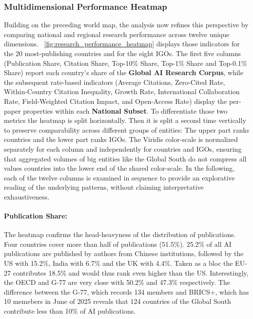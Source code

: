 \documentclass{article}
\begin{document}
	
	
	
	\subsubsection{Multidimensional Performance Heatmap}
	\label{performance_heatmap}
	Building on the preceding world map, the analysis now refines this perspective by comparing national and regional research performance across twelve unique dimensions. \figurename~\ref{fig:research_performance_heatmap} displays those indicators for the 20 most-publishing countries and for the eight IGOs. The first five columns (Publication Share, Citation Share, Top-10\% Share, Top-1\% Share and Top-0.1\% Share) report each country’s share of the \textbf{Global AI Research Corpus}, while the subsequent rate-based indicators (Average Citations, Zero-Cited Rate, Within-Country Citation Inequality, Growth Rate, International Collaboration Rate, Field-Weighted Citation Impact, and Open-Access Rate) display the per-paper properties within each \textbf{National Subset}. To differentiate those two metrics the heatmap is split horizontally. Then it is split a second time vertically to preserve comparability across different groups of entities: The upper part ranks countries and the lower part ranks IGOs. The Viridis color-scale is normalized separately for each column and independently for countries and IGOs, ensuring that aggregated volumes of big entities like the Global South do not compress all values countries into the lower end of the shared color-scale. In the following, each of the twelve columns is examined in sequence to provide an explorative reading of the underlying patterns, without claiming interpretative exhaustiveness.
	
	\paragraph{Publication Share:} The heatmap confirms the head-heavyness of the distribution of publications. Four countries cover more than half of publications (51.5\%). 25.2\% of all AI publications are published by authors from Chinese institutions, followed by the US with 15.2\%, India with 6.7\% and the UK with 4.4\%. Taken as a bloc the EU-27 contributes 18.5\% and would thus rank even higher than the US. Interestingly, the OECD and G-77 are very close with 50.2\% and 47.3\% respectively. The difference between the G-77, which records 134 members and BRICS+, which has 10 memebers in June of 2025 reveals that 124 countries of the Global South contribute less than 10\% of AI publications.
	
\end{document}
